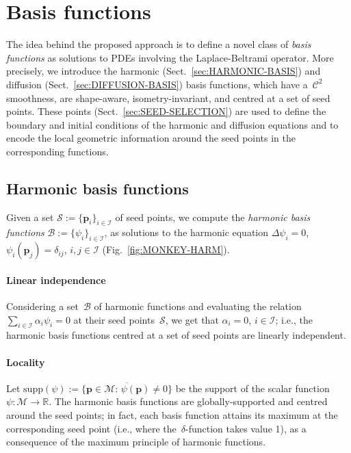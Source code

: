 \documentclass[acmtog,authorversion]{acmart}
\begin{document}
\newpage
\section{Basis functions\label{sec:SPECTRAL-BASIS}}
The idea behind the proposed approach is to define a novel class of \emph{basis functions} as solutions to PDEs involving the Laplace-Beltrami operator. More precisely, we introduce the harmonic (Sect.~\ref{sec:HARMONIC-BASIS}) and diffusion (Sect.~\ref{sec:DIFFUSION-BASIS}) basis functions, which have a~$\mathcal{C}^{2}$ smoothness, are shape-aware, isometry-invariant, and centred at a set of seed points. These points (Sect.~\ref{sec:SEED-SELECTION}) are used to define the boundary and initial conditions of the harmonic and diffusion equations and to encode the local geometric information around the seed points in the corresponding functions.

\subsection{Harmonic basis functions\label{sec:HARMONIC-BASIS}}
Given a set \mbox{$\mathcal{S}:=\{\mathbf{p}_{i}\}_{i\in\mathcal{I}}$} of seed points, we compute the \emph{harmonic basis functions} \mbox{$\mathcal{B}:=\{\psi_{i}\}_{i\in\mathcal{I}}$}, as solutions to the harmonic equation \mbox{$\Delta\psi_{i}=0$}, \mbox{$\psi_{i}(\mathbf{p}_{j})=\delta_{ij}$}, \mbox{$i,j\in\mathcal{I}$} (Fig.~\ref{fig:MONKEY-HARM}). 

\paragraph{Linear independence} 
Considering a set~$\mathcal{B}$ of harmonic functions and evaluating the relation \mbox{$\sum_{i\in\mathcal{I}}\alpha_{i}\psi_{i}=0$} at their seed points~$\mathcal{S}$, we get that \mbox{$\alpha_{i}=0$}, \mbox{$i\in\mathcal{I}$}; i.e., the harmonic basis functions centred at a set of seed points are linearly independent. 

\paragraph*{Locality}
Let \mbox{$\textrm{supp}(\psi):=\overline{\{\mathbf{p}\in\mathcal{M}:\,\psi(\mathbf{p})\neq 0\}}$} be the support of the scalar function \mbox{$\psi:\mathcal{M}\rightarrow\mathbb{R}$}. The harmonic basis functions are globally-supported and centred around the seed points; in fact, each basis function attains its maximum at the corresponding seed point (i.e., where the~$\delta$-function takes value 1), as a consequence of the maximum principle of harmonic functions.
\end{document}

